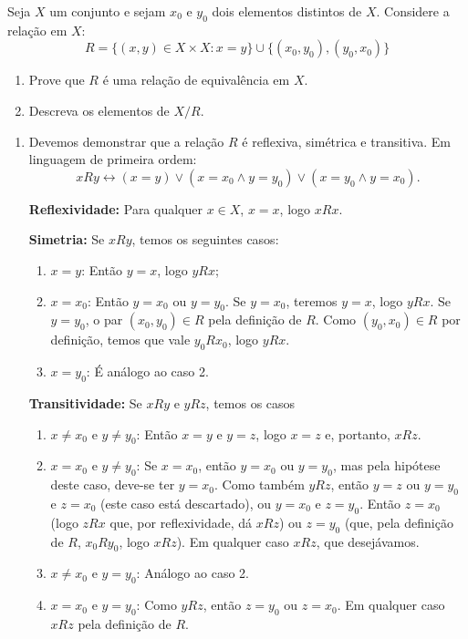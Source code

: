 \begin{exercicio}
	Seja $X$ um conjunto e sejam $x_0$ e $y_0$ dois elementos distintos de $X$. Considere a relação em $X$:
	$$R=\{(x,y)\in X\times X:x=y\}\cup\{(x_0,y_0),(y_0,x_0)\}$$
	\begin{enumerate}[label=(\alph{*})]
		\item Prove que $R$ é uma relação de equivalência em $X$.
		\item Descreva os elementos de $X/R$.
	\end{enumerate}
\end{exercicio}
\begin{solucao}
	\begin{enumerate}[label=(\alph{*})]
		\item Devemos demonstrar que a relação $R$ é reflexiva, simétrica e transitiva. Em linguagem de primeira ordem:
		$$xRy\leftrightarrow(x=y)\vee(x=x_0\wedge y=y_0)\vee(x=y_0\wedge y=x_0).$$
		
		\textbf{Reflexividade:} Para qualquer $x\in X$, $x=x$, logo $xRx$.
		
		\textbf{Simetria:} Se $xRy$, temos os seguintes casos:
		\begin{enumerate}[label=Caso \arabic{*}.]
			\item $x=y$: Então $y=x$, logo $yRx$;
			\item $x=x_0$: Então $y=x_0$ ou $y=y_0$. Se $y=x_0$, teremos $y=x$, logo $yRx$. Se $y=y_0$, o par $(x_0,y_0)\in R$ pela definição de $R$. Como $(y_0,x_0)\in R$ por definição, temos que vale $y_0Rx_0$, logo $yRx$.
			\item $x=y_0$: É análogo ao caso 2.
		\end{enumerate}
		
		\textbf{Transitividade:} Se $xRy$ e $yRz$, temos os casos
		\begin{enumerate}[label=Caso \arabic{*}.]
			\item $x\neq x_0$ e $y\neq y_0$: Então $x=y$ e $y=z$, logo $x=z$ e, portanto, $xRz$.
			\item $x=x_0$ e $y\neq y_0$: Se $x=x_0$, então $y=x_0$ ou $y=y_0$, mas pela hipótese deste caso, deve-se ter $y=x_0$. Como também $yRz$, então $y=z$ ou $y=y_0$ e $z=x_0$ (este caso está descartado), ou $y=x_0$ e $z=y_0$. Então $z=x_0$ (logo $zRx$ que, por reflexividade, dá $xRz$) ou $z=y_0$ (que, pela definição de $R$, $x_0Ry_0$, logo $xRz$). Em qualquer caso $xRz$, que desejávamos.
			\item $x\neq x_0$ e $y=y_0$: Análogo ao caso 2.
			\item $x=x_0$ e $y=y_0$: Como $yRz$, então $z=y_0$ ou $z=x_0$. Em qualquer caso $xRz$ pela definição de $R$.
		\end{enumerate}
		

\end{enumerate}
\end{solucao}
